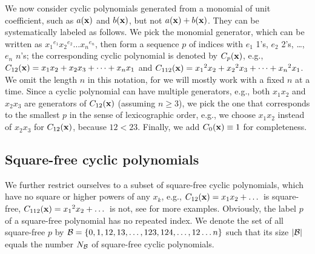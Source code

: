 \documentclass[preprint]{revtex4-1}
\begin{document}
We now consider cyclic polynomials
  generated from a monomial of unit coefficient,
  such as $a(\mathbf{x})$ and $b(\mathbf{x})$, but not $a(\mathbf{x}) + b(\mathbf{x})$.
They can be systematically labeled as follows.
We pick the monomial generator,
  which can be written as
  ${x_1}^{e_1} {x_2}^{e_2} \dots {x_n}^{e_n}$,
  then form a sequence $p$ of indices with
  $e_1$ 1's, $e_2$ 2's, \ldots, $e_n$ $n$'s;
  the corresponding cyclic polynomial is denoted by $C_p(\mathbf{x})$,
e.g.,
  $C_{12}(\mathbf{x})  = x_1 x_2 + x_2 x_3 + \dots + x_n x_1$ and
  $C_{112}(\mathbf{x}) = {x_1}^2 x_2 + {x_2}^2 x_3 + \dots + {x_n}^2 x_1$.
We omit the length $n$ in this notation,
  for we will mostly work with a fixed $n$ at a time.
Since a cyclic polynomial can have multiple generators,
  e.g., both $x_1 x_2$ and $x_2 x_3$ are generators of $C_{12}(\mathbf{x})$
   (assuming $n \ge 3$),
  we pick the one that corresponds to
  the smallest $p$
  in the sense of lexicographic order,
  e.g., we choose $x_1 x_2$ instead of $x_2 x_3$ for $C_{12}(\mathbf{x})$,
  because $12 < 23$.
Finally, we add $C_0(\mathbf{x}) \equiv 1$ for completeness.
%
%
%



\subsection{Square-free cyclic polynomials}




We further restrict ourselves to
  a subset of square-free cyclic polynomials,
  which have no square or higher powers of any $x_k$,
  e.g., $C_{12}(\mathbf{x}) = x_1 x_2 + \dots$ is square-free,
  $C_{112}(\mathbf{x}) = {x_1}^2 x_2 + \dots$ is not,
  see  for more examples.
Obviously, the label $p$ of a square-free polynomial
  has no repeated index.
We denote the set of all square-free $p$ by
$\mathcal B = \{0, 1, 12, 13, \ldots, 123, 124, \ldots, 12\dots n\}$
such that its size $|\mathcal B|$ equals the number $N_\mathcal B$ of
  square-free cyclic polynomials.
\end{document}
